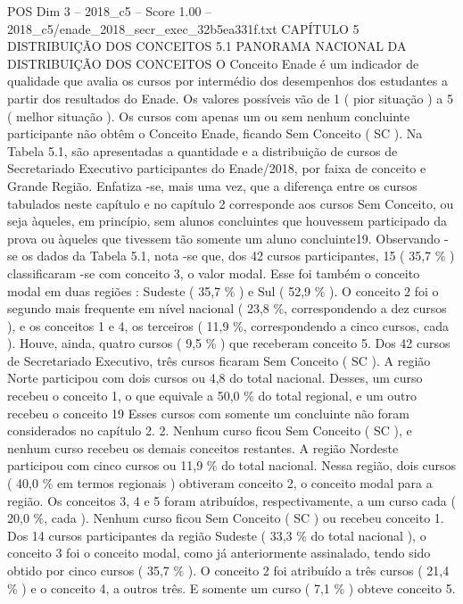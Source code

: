 \begin{textsample}{POS Dim 3 – 2018\_c5 – Score 1.00 – 2018\_c5/enade\_2018\_secr\_exec\_32b5ea331f.txt}  \label{ex:f3_pos_182}
CAPÍTULO 5 DISTRIBUIÇÃO DOS CONCEITOS 5.1 PANORAMA NACIONAL DA DISTRIBUIÇÃO DOS CONCEITOS O Conceito Enade é um indicador de qualidade que avalia os cursos por intermédio dos desempenhos dos estudantes a partir dos resultados do Enade.
Os valores possíveis vão de 1 ( pior situação ) a 5 ( melhor situação ).
Os cursos com apenas um ou sem nenhum concluinte participante não obtêm o Conceito Enade, ficando Sem Conceito ( SC ).
Na Tabela 5.1, são apresentadas a quantidade e a distribuição de cursos de Secretariado Executivo participantes do Enade/2018, por faixa de conceito e Grande Região.
Enfatiza -se, mais uma vez, que a diferença entre os cursos tabulados neste capítulo e no capítulo 2 corresponde aos cursos Sem Conceito, ou seja àqueles, em princípio, sem alunos concluintes que houvessem participado da prova ou àqueles que tivessem tão somente um aluno concluinte19.
Observando -se os dados da Tabela 5.1, nota -se que, dos 42 cursos participantes, 15 ( 35,7 \% ) classificaram -se com conceito 3, o valor modal.
Esse foi também o conceito modal em duas regiões : Sudeste ( 35,7 \% ) e Sul ( 52,9 \% ).
O conceito 2 foi o segundo mais frequente em nível nacional ( 23,8 \%, correspondendo a dez cursos ), e os conceitos 1 e 4, os terceiros ( 11,9 \%, correspondendo a cinco cursos, cada ).
Houve, ainda, quatro cursos ( 9,5 \% ) que receberam conceito 5.
Dos 42 cursos de Secretariado Executivo, três cursos ficaram Sem Conceito ( SC ).
A região Norte participou com dois cursos ou 4,8 do total nacional.
Desses, um curso recebeu o conceito 1, o que equivale a 50,0 \% do total regional, e um outro recebeu o conceito 19 Esses cursos com somente um concluinte não foram considerados no capítulo 2. 2.
Nenhum curso ficou Sem Conceito ( SC ), e nenhum curso recebeu os demais conceitos restantes.
A região Nordeste participou com cinco cursos ou 11,9 \% do total nacional.
Nessa região, dois cursos ( 40,0 \% em termos regionais ) obtiveram conceito 2, o conceito modal para a região.
Os conceitos 3, 4 e 5 foram atribuídos, respectivamente, a um curso cada ( 20,0 \%, cada ).
Nenhum curso ficou Sem Conceito ( SC ) ou recebeu conceito 1.
Dos 14 cursos participantes da região Sudeste ( 33,3 \% do total nacional ), o conceito 3 foi o conceito modal, como já anteriormente assinalado, tendo sido obtido por cinco cursos ( 35,7 \% ).
O conceito 2 foi atribuído a três cursos ( 21,4 \% ) e o conceito 4, a outros três.
E somente um curso ( 7,1 \% ) obteve conceito 5.

\end{textsample}

